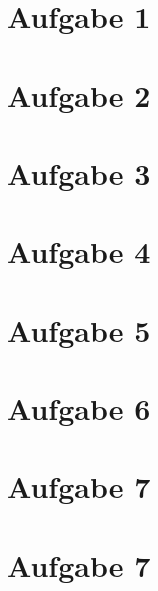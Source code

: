 \documentclass{article}
\begin{document}
  
\section*{Aufgabe 1}


\section*{Aufgabe 2}

  
\section*{Aufgabe 3}

  
\section*{Aufgabe 4}


\section*{Aufgabe 5}


\section*{Aufgabe 6}


\section*{Aufgabe 7}


\section*{Aufgabe 7}

  
\end{document}
